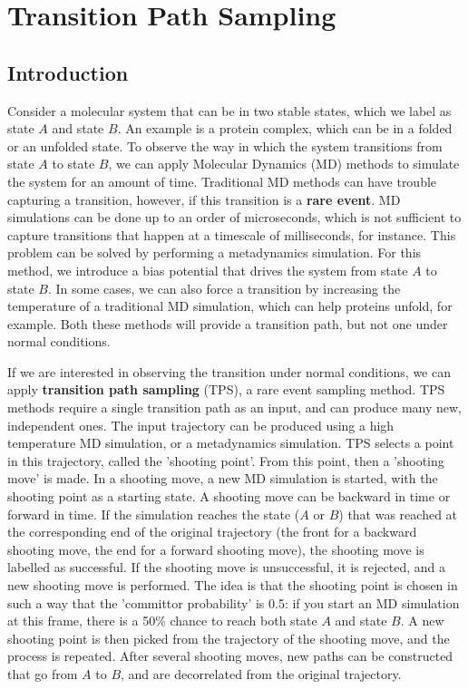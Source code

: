 \documentclass[]{article}
\begin{document}
\section*{Transition Path Sampling}

\subsection*{Introduction}

Consider a molecular system that can be in two stable states, which we label as state $A$ and state $B$. An example is a protein complex, which can be in a folded or an unfolded state. To observe the way in which the system transitions from state $A$ to state $B$, we can apply Molecular Dynamics (MD) methods to simulate the system for an amount of time. Traditional MD methods can have trouble capturing a transition, however, if this transition is a \textbf{rare event}. MD simulations can be done up to an order of microseconds, which is not sufficient to capture transitions that happen at a timescale of milliseconds, for instance. This problem can be solved by performing a metadynamics simulation. For this method, we introduce a bias potential that drives the system from state $A$ to state $B$. In some cases, we can also force a transition by increasing the temperature of a traditional MD simulation, which can help proteins unfold, for example. Both these methods will provide a transition path, but not one under normal conditions. 

If we are interested in observing the transition under normal conditions, we can apply \textbf{transition path sampling} (TPS), a rare event sampling method. TPS methods require a single transition path as an input, and can produce many new, independent ones. The input trajectory can be produced using a high temperature MD simulation, or a metadynamics simulation. TPS selects a point in this trajectory, called the 'shooting point'. From this point, then a 'shooting move' is made. In a shooting move, a new MD simulation is started, with the shooting point as a starting state. A shooting move can be backward in time or forward in time. If the simulation reaches the state ($A$ or $B$) that was reached at the corresponding end of the original trajectory (the front for a backward shooting move, the end for a forward shooting move), the shooting move is labelled as successful. If the shooting move is unsuccessful, it is rejected, and a new shooting move is performed. The idea is that the shooting point is chosen in such a way that the 'committor probability' is 0.5: if you start an MD simulation at this frame, there is a 50\% chance to reach both state $A$ and state $B$. A new shooting point is then picked from the trajectory of the shooting move, and the process is repeated. After several shooting moves, new paths can be constructed that go from $A$ to $B$, and are decorrelated from the original trajectory.
\end{document}
